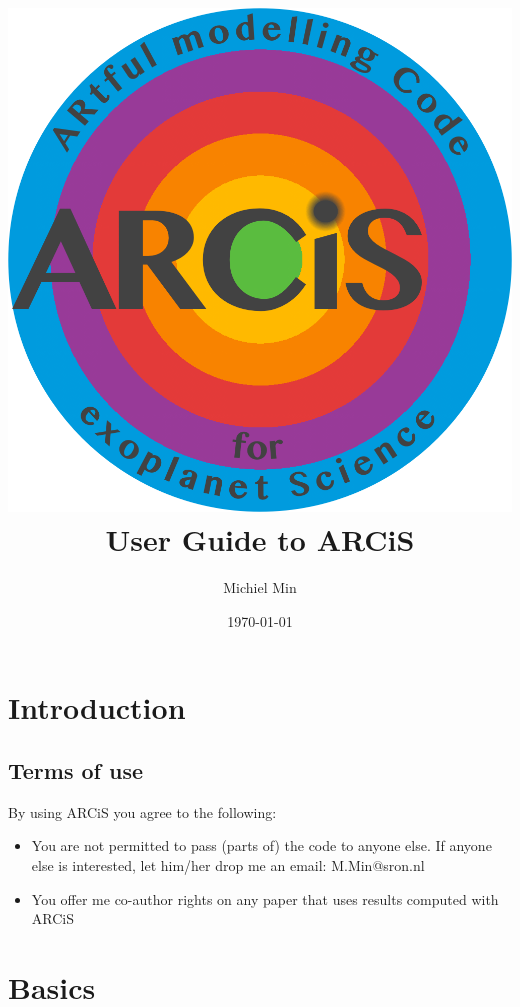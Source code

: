 \documentclass[12pt]{article}
\begin{document}
\title{\includegraphics[width=0.9\hsize]{ARCiS}\\User Guide to ARCiS}
\author{Michiel Min}
\date{\today}
\maketitle

\section{Introduction}


\subsection{Terms of use}

By using ARCiS you agree to the following:
\begin{itemize}
\item You are not permitted to pass (parts of) the code to anyone else. If anyone else is interested, let him/her drop me an email: M.Min@sron.nl
\item You offer me co-author rights on any paper that uses results computed with ARCiS
\end{itemize}

\section{Basics}
\end{document}
